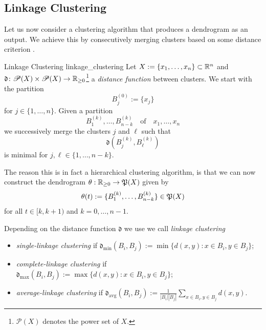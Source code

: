 \subsection{Linkage Clustering}
\label{section__linkage_clustering}
Let us now consider a clustering algorithm that produces a dendrogram as an output. We achieve this by consecutively merging clusters based on some distance criterion \cite[Sec.~4.2.2]{Everitt2011}.

\begin{definition}{Linkage Clustering }{linkage_clustering}
Let $X := \{x_1, \dots, x_n\} \subset \R^n$ and $\mathfrak{d}\colon\mathscr{P}(X) \times \mathscr{P}(X) \to \R_{\geq0}$\footnote{$\mathscr{P}(X)$ denotes the power set of $X$.} a \emph{distance function} between clusters. We start with the partition
$$
B^{(0)}_j := \{x_j\}$$
for $j \in \{1, \dots, n\}$. Given a partition
$$
B^{(k)}_1, \dots, B^{(k)}_{n - k} \quad \text{of} \quad x_1, \dots, x_n
$$
we successively merge the clusters $j$ and $\ell$ such that
$$
\mathfrak{d}(B^{(k)}_j,B^{(k)}_\ell)
$$
is minimal for $j,\ell \in \{1, \dots, n - k\}$.
\end{definition}
The reason this is in fact a hierarchical clustering algorithm, is that we can now construct the dendrogram $\theta: \R_{\geq0} \to \P(X)$ given by
$$
\theta(t) := \{B_1^{(k)}, \dots, B_{n-k}^{(k)}\} \in \P(X)
$$
for all $t \in [k, k+1)$ and $k = 0, \dots, n-1$.


Depending on the distance function $\mathfrak{d}$ we use we call \emph{linkage clustering}

\begin{itemize}
    \item \emph{single-linkage clustering} if $\mathfrak{d}_\mathrm{min} (B_i, B_j) := \min\{d(x,y): x \in B_i, y \in B_j\}$;
    \item \emph{complete-linkage clustering} if $\mathfrak{d}_\mathrm{max} (B_i, B_j) := \max\{d(x,y): x \in B_i, y \in B_j\}$;
    \item \emph{average-linkage clustering} if $\mathfrak{d}_\mathrm{avg}(B_i,B_j) := \frac{1}{|B_i||B_j|} \sum_{x \in B_i, y \in B_j} d(x,y)$.
\end{itemize}


